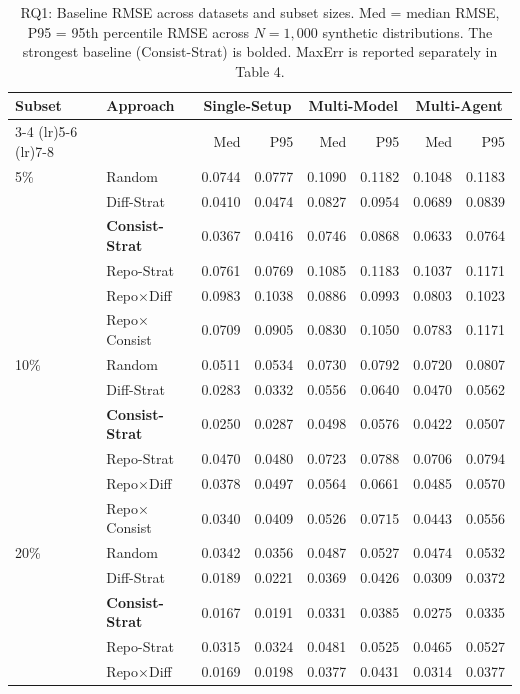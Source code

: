 \begin{table}[t]
\centering
\caption{RQ1: Baseline RMSE across datasets and subset sizes. Med = median RMSE, P95 = 95th percentile RMSE across $N{=}1{,}000$ synthetic distributions. The strongest baseline (Consist-Strat) is bolded. MaxErr is reported separately in Table 4.}
\label{tab:rq1-rmse}
\begin{tabular}{llrrrrrr}
\toprule
Subset & Approach & \multicolumn{2}{c}{Single-Setup} & \multicolumn{2}{c}{Multi-Model} & \multicolumn{2}{c}{Multi-Agent} \\
\cmidrule(lr){3-4} \cmidrule(lr){5-6} \cmidrule(lr){7-8}
 &  & Med & P95 & Med & P95 & Med & P95 \\
\midrule
5\% & Random & 0.0744 & 0.0777 & 0.1090 & 0.1182 & 0.1048 & 0.1183 \\
 & Diff-Strat & 0.0410 & 0.0474 & 0.0827 & 0.0954 & 0.0689 & 0.0839 \\
 & \textbf{Consist-Strat} & 0.0367 & 0.0416 & 0.0746 & 0.0868 & 0.0633 & 0.0764 \\
 & Repo-Strat & 0.0761 & 0.0769 & 0.1085 & 0.1183 & 0.1037 & 0.1171 \\
 & Repo$\times$Diff & 0.0983 & 0.1038 & 0.0886 & 0.0993 & 0.0803 & 0.1023 \\
 & Repo$\times$Consist & 0.0709 & 0.0905 & 0.0830 & 0.1050 & 0.0783 & 0.1171 \\
\midrule
10\% & Random & 0.0511 & 0.0534 & 0.0730 & 0.0792 & 0.0720 & 0.0807 \\
 & Diff-Strat & 0.0283 & 0.0332 & 0.0556 & 0.0640 & 0.0470 & 0.0562 \\
 & \textbf{Consist-Strat} & 0.0250 & 0.0287 & 0.0498 & 0.0576 & 0.0422 & 0.0507 \\
 & Repo-Strat & 0.0470 & 0.0480 & 0.0723 & 0.0788 & 0.0706 & 0.0794 \\
 & Repo$\times$Diff & 0.0378 & 0.0497 & 0.0564 & 0.0661 & 0.0485 & 0.0570 \\
 & Repo$\times$Consist & 0.0340 & 0.0409 & 0.0526 & 0.0715 & 0.0443 & 0.0556 \\
\midrule
20\% & Random & 0.0342 & 0.0356 & 0.0487 & 0.0527 & 0.0474 & 0.0532 \\
 & Diff-Strat & 0.0189 & 0.0221 & 0.0369 & 0.0426 & 0.0309 & 0.0372 \\
 & \textbf{Consist-Strat} & 0.0167 & 0.0191 & 0.0331 & 0.0385 & 0.0275 & 0.0335 \\
 & Repo-Strat & 0.0315 & 0.0324 & 0.0481 & 0.0525 & 0.0465 & 0.0527 \\
 & Repo$\times$Diff & 0.0169 & 0.0198 & 0.0377 & 0.0431 & 0.0314 & 0.0377 \\

\end{tabular}
\end{table}
